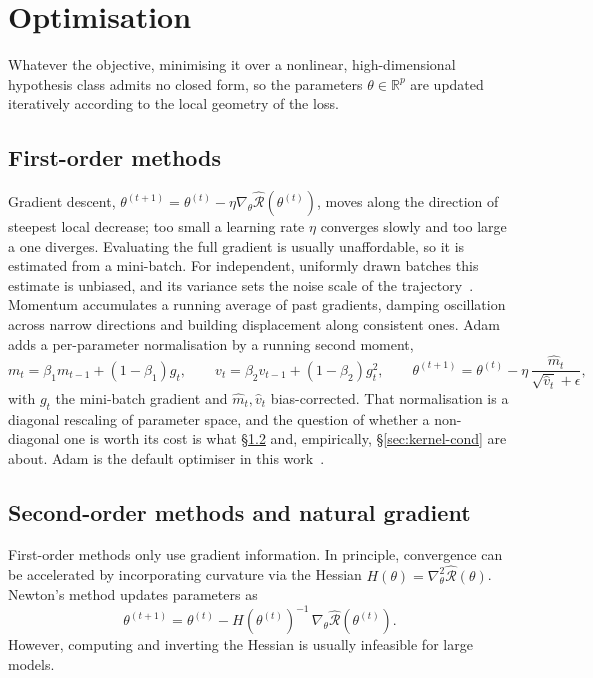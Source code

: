 \section{Optimisation}
\label{sec:ml_optimization}

Whatever the objective, minimising it over a nonlinear, high-dimensional hypothesis class
admits no closed form, so the parameters $\theta\in\mathbb R^p$ are updated iteratively
according to the local geometry of the loss.  

\subsection{First-order methods}
\label{subsec:first-order}
Gradient descent, $\theta^{(t+1)}=\theta^{(t)}-\eta\nabla_\theta\hat{\mathcal R}(\theta^{(t)})$,
moves along the direction of steepest local decrease; too small a learning rate $\eta$
converges slowly and too large a one diverges. Evaluating the full gradient is usually
unaffordable, so it is estimated from a mini-batch. For independent, uniformly drawn batches
this estimate is unbiased, and its variance sets the noise scale of the
trajectory~\cite{wu2022alignmentpropertysgdnoise}. Momentum
accumulates a running average of past gradients, damping oscillation across narrow directions
and building displacement along consistent ones. Adam~\cite{KingmaBa2015-Adam} adds a
per-parameter normalisation by a running second moment,
\begin{equation}
  m_t = \beta_1 m_{t-1} + (1-\beta_1)g_t,\qquad
  v_t = \beta_2 v_{t-1} + (1-\beta_2)g_t^2,\qquad
  \theta^{(t+1)} = \theta^{(t)} - \eta\,\frac{\hat m_t}{\sqrt{\hat v_t}+\epsilon},
\end{equation}
with $g_t$ the mini-batch gradient and $\hat m_t,\hat v_t$ bias-corrected. That
normalisation is a diagonal rescaling of parameter space, and the question of whether a
non-diagonal one is worth its cost is what \S\ref{subsec:natgrad} and, empirically,
\S\ref{sec:kernel-cond} are about. Adam is the default optimiser in this
work~\cite{ZhangEtAl2022-AdamConverges}.

\subsection{Second-order methods and natural gradient}
\label{subsec:natgrad}
First-order methods only use gradient information. In principle, convergence can be 
accelerated by incorporating curvature via the Hessian 
$H(\theta)=\nabla^2_\theta \hat{\mathcal{R}}(\theta)$.  
Newton’s method updates parameters as
\begin{equation}
  \theta^{(t+1)} = \theta^{(t)} - H(\theta^{(t)})^{-1}\,\nabla_\theta \hat{\mathcal{R}}(\theta^{(t)}).
\end{equation}
However, computing and inverting the Hessian is usually infeasible for large models.  


